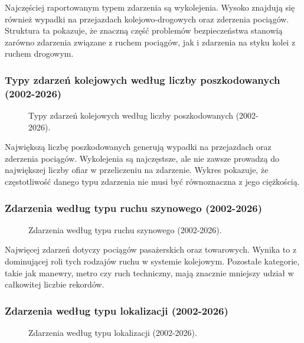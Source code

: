 \documentclass[12pt]{article}
\begin{document}
Najczęściej raportowanym typem zdarzenia są wykolejenia. Wysoko znajdują się również wypadki na przejazdach kolejowo-drogowych oraz zderzenia pociągów. Struktura ta pokazuje, że znaczną część problemów bezpieczeństwa stanowią zarówno zdarzenia związane z ruchem pociągów, jak i zdarzenia na styku kolei z ruchem drogowym.

\subsubsection{Typy zdarzeń kolejowych według liczby poszkodowanych (2002-2026)}
\begin{figure}[H]
    \centering
    
    \caption{Typy zdarzeń kolejowych według liczby poszkodowanych (2002-2026).}
\end{figure}

Największą liczbę poszkodowanych generują wypadki na przejazdach oraz zderzenia pociągów. Wykolejenia są najczęstsze, ale nie zawsze prowadzą do największej liczby ofiar w przeliczeniu na zdarzenie. Wykres pokazuje, że częstotliwość danego typu zdarzenia nie musi być równoznaczna z jego ciężkością.

\subsubsection{Zdarzenia według typu ruchu szynowego (2002-2026)}
\begin{figure}[H]
    \centering
    
    \caption{Zdarzenia według typu ruchu szynowego (2002-2026).}
\end{figure}


Najwięcej zdarzeń dotyczy pociągów pasażerskich oraz towarowych. Wynika to z dominującej roli tych rodzajów ruchu w systemie kolejowym. Pozostałe kategorie, takie jak manewry, metro czy ruch techniczny, mają znacznie mniejszy udział w całkowitej liczbie rekordów.

\subsubsection{Zdarzenia według typu lokalizacji (2002-2026)}
\begin{figure}[H]
    \centering
    
    \caption{Zdarzenia według typu lokalizacji (2002-2026).}
\end{figure}
\end{document}
